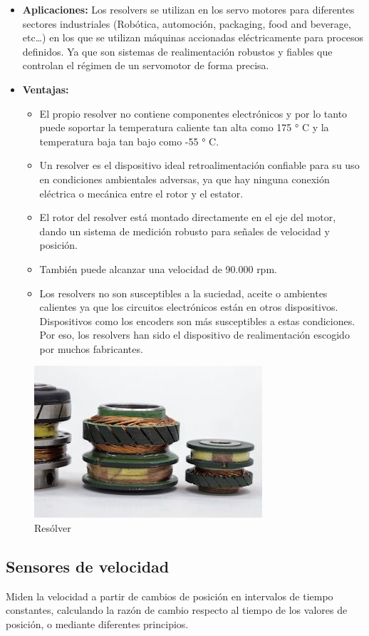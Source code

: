 \begin{itemize}
	\item \textbf{Aplicaciones:} Los resolvers se utilizan en los servo motores para diferentes sectores industriales (Robótica, automoción, packaging, food and beverage, etc…) en los que se utilizan máquinas accionadas eléctricamente para procesos definidos. Ya que son sistemas de realimentación robustos y fiables que controlan el régimen de un servomotor de forma precisa.
	\item \textbf{Ventajas:}
	\begin{itemize}
		\item El propio resolver no contiene componentes electrónicos y por lo tanto puede soportar la temperatura caliente tan alta como 175 ° C y la temperatura baja tan bajo como -55 ° C.
		\item Un resolver es el dispositivo ideal retroalimentación confiable para su uso en condiciones ambientales adversas, ya que hay ninguna conexión eléctrica o mecánica entre el rotor y el estator.
		\item El rotor del resolver está montado directamente en el eje del motor, dando un sistema de medición robusto para señales de velocidad y posición.
		\item También puede alcanzar una velocidad de 90.000 rpm.
		\item Los resolvers no son susceptibles a la suciedad, aceite o ambientes calientes ya que los circuitos electrónicos están en otros dispositivos. Dispositivos como los encoders son más susceptibles a estas condiciones. Por eso, los resolvers han sido el dispositivo de realimentación escogido por muchos fabricantes.
	\end{itemize}
\end{itemize}

\begin{figure}
	\centering
	\includegraphics[width=0.4\linewidth]{img/resolver}
	\caption{Resólver}
	\label{fig:resolver}
\end{figure}



\subsection{Sensores de velocidad} Miden la velocidad a partir de cambios de posición en intervalos de tiempo constantes, calculando la razón de cambio respecto al tiempo de los valores de posición, o mediante diferentes principios.

